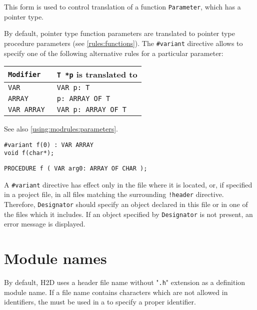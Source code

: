 This form is used to control translation of a
function \verb'Parameter', which has a pointer type.

By default, pointer type function parameters are translated to
pointer type procedure parameters (see \ref{rules:functions}).
The \verb'#variant' directive allows to specify one of the
following alternative rules for a particular parameter:

\begin{center}
\begin{tabular}{ll}
\tt Modifier  & {\tt T *p} is translated to \\
\hline
\tt VAR       & \tt VAR p: T           \\
\tt ARRAY     & \tt p: ARRAY OF T      \\
\tt VAR ARRAY & \tt VAR p: ARRAY OF T
\end{tabular}
\end{center}

See also \ref{using:modrules:parameters}.

\begin{verbatim}
#variant f(0) : VAR ARRAY
void f(char*);
\end{verbatim}

\begin{verbatim}
PROCEDURE f ( VAR arg0: ARRAY OF CHAR );
\end{verbatim}

A {\tt \#variant} directive has effect only in the file where it
is located, or, if specified in a project file, in all files matching
the surrounding {\tt !header} directive. Therefore, {\tt Designator}
should specify an object declared in this file or in one of the files
which it includes. If an object specified by {\tt Designator} is not present,
an error message is displayed.

\section{Module names}
\label{rules:modulenames}
By default, H2D uses a header file name without "\verb'.h'" extension as
a definition module name. If a file name contains characters which are
not allowed in identifiers, the  must be used
in a \ProjectFile{} to specify a proper identifier.


